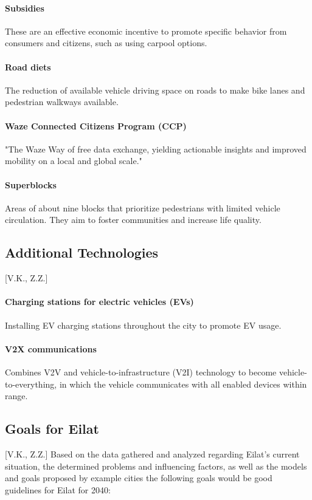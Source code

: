 \documentclass[12pt]{article}                       %
\begin{document}
\paragraph{Subsidies} These are an effective economic incentive to promote specific behavior from consumers and citizens, such as using carpool options.

\paragraph{Road diets} The reduction of available vehicle driving space on roads to make bike lanes and pedestrian walkways available.

\paragraph{Waze Connected Citizens Program (CCP)} "The Waze Way of free data exchange, yielding actionable insights and improved mobility on a local and global scale."

\paragraph{Superblocks} Areas of about nine blocks that prioritize pedestrians with limited vehicle circulation. They aim to foster communities and increase life quality.

\subsection{Additional Technologies}[V.K., Z.Z.]
\paragraph{Charging stations for electric vehicles (EVs)} Installing EV charging stations throughout the city to promote EV usage.

\paragraph{V2X communications} Combines V2V and vehicle-to-infrastructure (V2I) technology to become vehicle-to-everything, in which the vehicle communicates with all enabled devices within range.

\subsection{Goals for Eilat}[V.K., Z.Z.]
Based on the data gathered and analyzed regarding Eilat's current situation, the determined problems and influencing factors, as well as the models and goals proposed by example cities the following goals would be good guidelines for Eilat for 2040:
\end{document}
